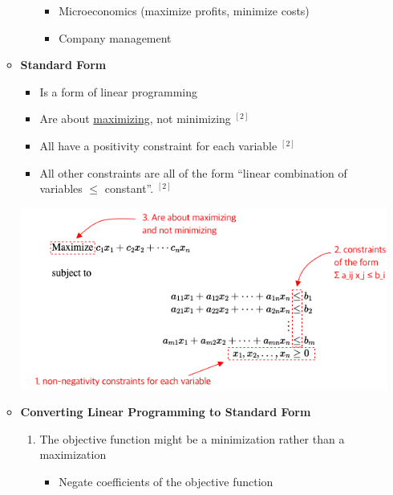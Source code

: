 \documentclass[12pt]{article}
\begin{document}
\begin{enumerate}[1.]
\begin{itemize}
\begin{itemize}
            \begin{itemize}
                \item Microeconomics (maximize profits, minimize costs)
                \item Company management
            \end{itemize}
        \end{itemize}

        \item \textbf{Standard Form}

        \begin{itemize}
            \item Is a form of linear programming
            \item Are about \ul{maximizing}, not minimizing $^{[2]}$
            \item All have a positivity constraint for each variable $^{[2]}$
            \item All other constraints are all of the form “linear combination of variables $\leq$ constant”. $^{[2]}$
        \end{itemize}

        \bigskip

        \begin{center}
        \includegraphics[width=0.8\linewidth]{images/worksheet_6_solution_1.png}
        \end{center}

        \item \textbf{Converting Linear Programming to Standard Form}

        \begin{enumerate}[1)]
            \item The objective function might be a minimization rather than a maximization

            \begin{itemize}
                \item Negate coefficients of the objective function
            \end{itemize}


\end{enumerate}
\end{itemize}
\end{enumerate}
\end{document}

